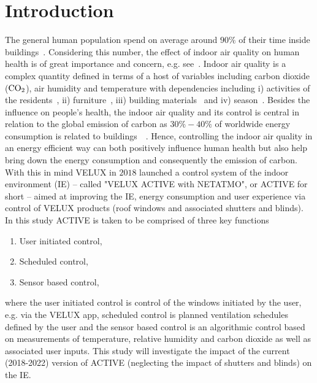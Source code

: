 \documentclass[fleqn,usenatbib,nofootinbib]{revtex4-2}
\begin{document}
	\section{Introduction}
	\label{sec:intro}
	The general human population spend on average around $90\%$ of their time inside buildings~\citep{Freijer2000,Yassi2001}. Considering this number, the effect of indoor air quality on human health is of great importance and concern, e.g. see~\citep{Rumchev2004,Arif2007,Qian2010,Billionnet2011,Ayoko2014}. Indoor air quality is a complex quantity defined in terms of a host of variables including carbon dioxide ($\rm CO_2$), air humidity and temperature with dependencies including i) activities of the residents~\citep{Morawska2003,Edwards2006,Eklund2008,Buonanno2009,Buonanno2012}, ii) furniture~\citep{Yrieix2010}, iii) building materials~\citep{Missia2010} and iv) season~\citep{Schlink2004}. \newline
	Besides the influence on people's health, the indoor air quality and its control is central in relation to the global emission of carbon as $30\%- 40\%$ of worldwide energy consumption is related to buildings~~\citep{Ramesh2010}. 
	Hence, controlling the indoor air quality in an energy efficient way can both positively influence human health but also help bring down the energy consumption and consequently the emission of carbon. With this in mind VELUX in $2018$ launched a control system of the indoor environment (IE) -- called "VELUX ACTIVE with NETATMO", or ACTIVE for short -- aimed at improving the IE, energy consumption and user experience via control of VELUX products (roof windows and associated shutters and blinds). In this study ACTIVE is taken to be comprised of three key functions
	\begin{enumerate}
		\item User initiated control,
		\item Scheduled control,
		\item Sensor based control,
	\end{enumerate}
	where the user initiated control is control of the windows initiated by the user, e.g. via the VELUX app, scheduled control is planned ventilation schedules defined by the user and the sensor based control is an algorithmic control based on measurements of temperature, relative humidity and carbon dioxide as well as associated user inputs. This study will investigate the impact of the current (2018-2022) version of ACTIVE (neglecting the impact of shutters and blinds) on the IE.
	
\end{document}
